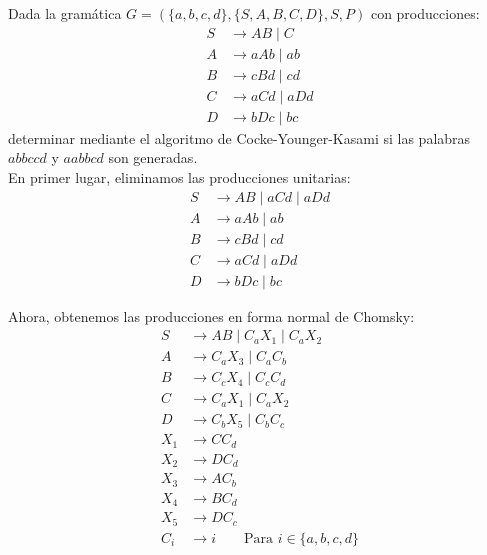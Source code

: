 \begin{ejercicio}\label{ej:1.6.8}
    Dada la gramática $G=(\{a,b,c,d\},\{S,A,B,C,D\},S,P)$ con producciones:
    \begin{align*}
        S &\rightarrow AB \mid C \\
        A &\rightarrow aAb \mid ab \\
        B &\rightarrow cBd \mid cd \\
        C &\rightarrow aCd \mid aDd \\
        D &\rightarrow bDc \mid bc
    \end{align*}
    determinar mediante el algoritmo de Cocke-Younger-Kasami si las palabras $abbccd$ y $aabbcd$ son generadas.\\

    En primer lugar, eliminamos las producciones unitarias:
    \begin{align*}
        S &\rightarrow AB \mid aCd\mid aDd \\
        A &\rightarrow aAb \mid ab \\
        B &\rightarrow cBd \mid cd \\
        C &\rightarrow aCd \mid aDd \\
        D &\rightarrow bDc \mid bc
    \end{align*}

    Ahora, obtenemos las producciones en forma normal de Chomsky:
    \begin{align*}
        S &\rightarrow AB \mid C_aX_1\mid C_aX_2 \\
        A &\rightarrow C_aX_3 \mid C_aC_b \\
        B &\rightarrow C_cX_4 \mid C_cC_d \\
        C &\rightarrow C_aX_1 \mid C_aX_2 \\
        D &\rightarrow C_bX_5 \mid C_bC_c \\
        X_1 &\rightarrow CC_d \\
        X_2 &\rightarrow DC_d \\
        X_3 &\rightarrow AC_b \\
        X_4 &\rightarrow BC_d \\
        X_5 &\rightarrow DC_c \\
        C_i &\rightarrow i \qquad \text{Para } i\in \{a,b,c,d\}
    \end{align*}


\end{ejercicio}

